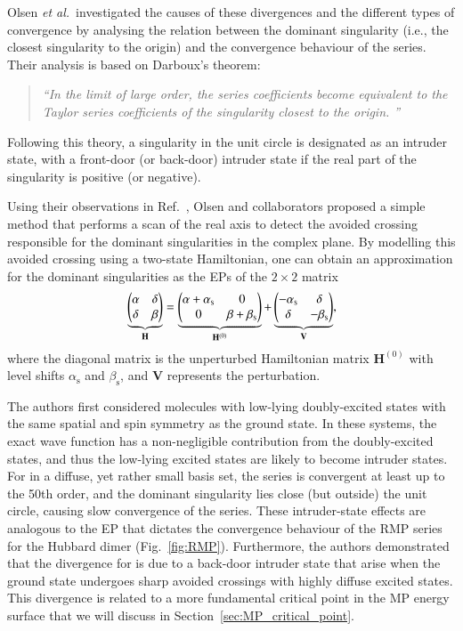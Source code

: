 \documentclass[aps,prb,reprint,noshowkeys,superscriptaddress]{revtex4-1}
\newcommand{\latin}[1]{#1}
\newcommand{\ie}{\latin{i.e.}}
\newcommand{\etal}{\textit{et al.}}
\newcommand{\bH}{\mathbf{H}}
\newcommand{\bV}{\mathbf{V}}
\begin{document}
Olsen \etal\ investigated the causes of these divergences and the different types of convergence by
analysing the relation between the dominant singularity (\ie, the closest singularity to the origin) 
and the convergence behaviour of the series.\cite{Olsen_2000} 
Their analysis is based on Darboux's theorem: \cite{Goodson_2011}
\begin{quote}
	\textit{``In the limit of large order, the series coefficients become equivalent to the Taylor series coefficients of the singularity closest to the origin. ''}
\end{quote}
Following this theory, a singularity in the unit circle is designated as an intruder state, 
with a front-door (or back-door) intruder state if the real part of the singularity is positive (or negative).

Using their observations in Ref.~, Olsen and collaborators proposed 
a simple method that performs a scan of the real axis to detect the avoided crossing responsible 
for the dominant singularities in the complex plane. \cite{Olsen_2000} 
By modelling this avoided crossing using a two-state Hamiltonian, one can obtain an approximation for
the dominant singularities as the EPs of the $2\times2$ matrix
\begin{equation}
	\label{eq:Olsen_2x2}
    \underbrace{\mqty(\alpha & \delta \\ \delta & \beta )}_{\bH} 
    = \underbrace{\mqty(\alpha + \alpha_{\text{s}} & 0 \\ 0 & \beta + \beta_{\text{s}} )}_{\bH^{(0)}} 
    + \underbrace{\mqty( -\alpha_{\text{s}} & \delta \\ \delta & - \beta_{\text{s}})}_{\bV},
\end{equation}
where the diagonal matrix is the unperturbed Hamiltonian matrix $\bH^{(0)}$ with level shifts
$\alpha_{\text{s}}$ and $\beta_{\text{s}}$, and $\bV$ represents the perturbation.

The authors first considered molecules with low-lying doubly-excited states with the same spatial
and spin symmetry as the ground state. \cite{Olsen_2000}
In these systems, the exact wave function has a non-negligible contribution from the doubly-excited states, 
and thus the low-lying excited states are likely to become intruder states. 
For  in a diffuse, yet rather small basis set, the series is convergent at least up to the 50th order, and
the dominant singularity lies close (but outside) the unit circle, causing slow convergence of the series.
These intruder-state effects are analogous to the EP that dictates the convergence behaviour of 
the RMP series for the Hubbard dimer (Fig.~\ref{fig:RMP}).
Furthermore, the authors demonstrated that the divergence for  is due to a back-door intruder state
that arise when the ground state undergoes sharp avoided crossings with highly diffuse excited states.
This divergence is related to a more fundamental critical point in the MP energy surface that we will
discuss in Section~\ref{sec:MP_critical_point}.
\end{document}
